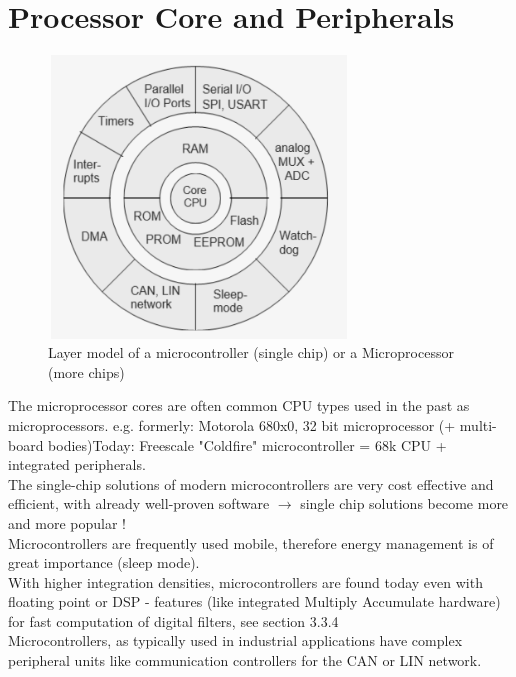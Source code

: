 \section{Processor Core and Peripherals}

    \begin{figure}[h]
    \centering
    \includegraphics[width=8cm, height=7.5cm]{Images/image160.png}
    \caption{Layer model of a microcontroller (single chip) or a Microprocessor (more chips)}
    \label{fig:Fig }
    \end{figure}

The microprocessor cores are often common CPU types used in the past as microprocessors. e.g. formerly: Motorola 680x0, 32 bit microprocessor (+ multi-board bodies)Today: Freescale "Coldfire" microcontroller = 68k CPU + integrated peripherals. \\

The single-chip solutions of modern microcontrollers are very cost effective and efficient, with already well-proven software $\rightarrow$ single chip solutions become more and more popular !\\

Microcontrollers are frequently used mobile, therefore energy management is of great importance (sleep mode).\\

With higher integration densities, microcontrollers are found today even with floating point or DSP - features (like integrated Multiply Accumulate hardware) for fast computation of digital filters, see section 3.3.4\\

Microcontrollers, as typically used in industrial applications have complex peripheral units like communication controllers for the CAN or LIN network.\\

